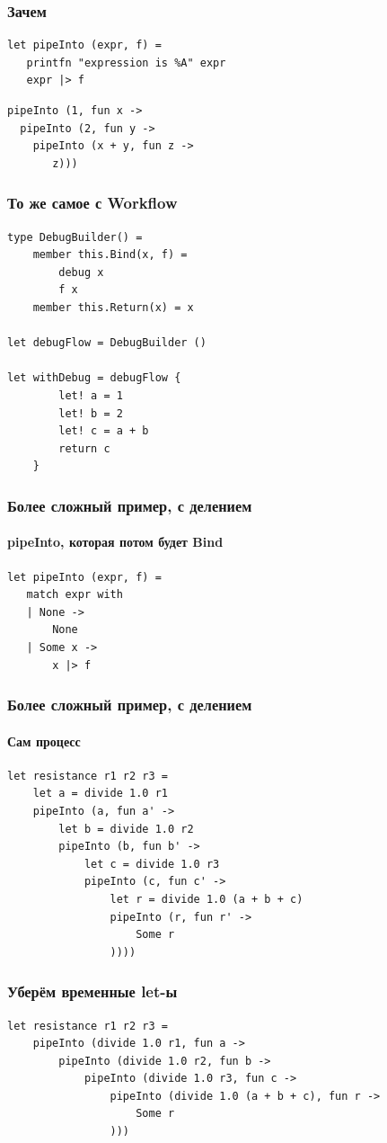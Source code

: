 \documentclass{../../slides-style}
\begin{document}
    \begin{frame}[fragile]
        \frametitle{Зачем}
        \begin{verbatim}
let pipeInto (expr, f) =
   printfn "expression is %A" expr 
   expr |> f 
        \end{verbatim}
        \begin{verbatim}
pipeInto (1, fun x ->
  pipeInto (2, fun y -> 
    pipeInto (x + y, fun z -> 
       z)))
        \end{verbatim}
    \end{frame}

    \begin{frame}[fragile]
        \frametitle{То же самое с Workflow}
        \begin{verbatim}
type DebugBuilder() =
    member this.Bind(x, f) = 
        debug x 
        f x
    member this.Return(x) = x

let debugFlow = DebugBuilder ()

let withDebug = debugFlow {
        let! a = 1
        let! b = 2
        let! c = a + b
        return c
    }
        \end{verbatim}
    \end{frame}

    \begin{frame}[fragile]
        \frametitle{Более сложный пример, с делением}
        \framesubtitle{pipeInto, которая потом будет Bind}
        \begin{verbatim}
let pipeInto (expr, f) =
   match expr with
   | None -> 
       None
   | Some x -> 
       x |> f
        \end{verbatim}
    \end{frame}

    \begin{frame}[fragile]
        \frametitle{Более сложный пример, с делением}
        \framesubtitle{Сам процесс}
        \begin{verbatim}
let resistance r1 r2 r3 = 
    let a = divide 1.0 r1
    pipeInto (a, fun a' ->
        let b = divide 1.0 r2
        pipeInto (b, fun b' ->
            let c = divide 1.0 r3
            pipeInto (c, fun c' ->
                let r = divide 1.0 (a + b + c)
                pipeInto (r, fun r' ->
                    Some r
                ))))
        \end{verbatim}
    \end{frame}

    \begin{frame}[fragile]
        \frametitle{Уберём временные let-ы}
        \begin{verbatim}
let resistance r1 r2 r3 = 
    pipeInto (divide 1.0 r1, fun a ->
        pipeInto (divide 1.0 r2, fun b ->
            pipeInto (divide 1.0 r3, fun c ->
                pipeInto (divide 1.0 (a + b + c), fun r ->
                    Some r
                )))
        \end{verbatim}
    \end{frame}
\end{document}

